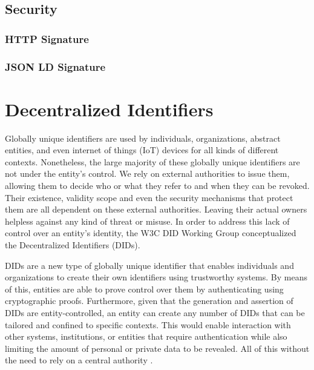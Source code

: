 \subsection{Security}

\subsubsection{HTTP Signature}

\subsubsection{JSON LD Signature}



\section{Decentralized Identifiers} \label{DIDs}
Globally unique identifiers are used by individuals, organizations, abstract entities, and even internet of things (IoT) devices for all kinds of different contexts. Nonetheless, the large majority of these globally unique identifiers are not under the entity's control. We rely on external authorities to issue them, allowing them to decide who or what they refer to and when they can be revoked. Their existence, validity scope and even the security mechanisms that protect them are all dependent on these external authorities. Leaving their actual owners helpless against any kind of threat or misuse. \cite{sporny_longley_sabadello_reed_steele_2021} In order to address this lack of control over an entity's identity, the W3C DID Working Group conceptualized the Decentralized Identifiers (DIDs).

DIDs are a new type of globally unique identifier that enables individuals and organizations to create their own identifiers using trustworthy systems. By means of this, entities are able to prove control over them by authenticating using cryptographic proofs. Furthermore, given that the generation and assertion of DIDs are entity-controlled, an entity can create any number of DIDs that can be tailored and confined to specific contexts. This would enable interaction with other systems, institutions, or entities that require authentication while also limiting the amount of personal or private data to be revealed. All of this without the need to rely on a central authority \cite{sporny_longley_sabadello_reed_steele_2021}.

 



